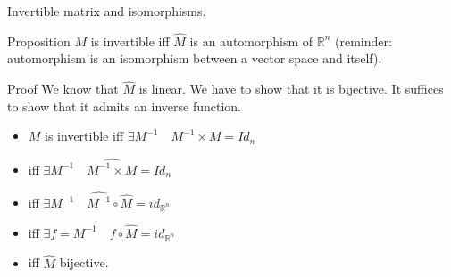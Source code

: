 \documentclass{beamer}
\begin{document}
\begin{frame}{Invertible matrix and isomorphisms.}
  \begin{block}{Proposition}
    $M$ is invertible iff $\widehat M$ is an automorphism of $\mathbb{R}^n$  (reminder: automorphism is an isomorphism between a vector space and itself).
  \end{block}

  \begin{exampleblock}{Proof}
    We know that $\widehat M$ is linear. We have to show that it is bijective. It suffices to show that it admits an inverse function.
    \begin{itemize}
    \item $M$ is invertible iff $\exists M^{-1}\quad M^{-1} \times M = Id_n$
    \item iff $\exists M^{-1} \quad \widehat{M^{-1} \times M} = \widehat{Id_n}$
    \item iff $\exists M^{-1} \quad \widehat{M^{-1}} \circ \widehat{M} = id_{\mathbb{R}^n}$
    \item iff $\exists f = M^{-1} \quad f \circ \widehat{M} = id_{\mathbb{R}^n}$
    \item iff $\widehat{M}$ bijective.
    \end{itemize}
  \end{exampleblock}

\end{frame}
\end{document}
